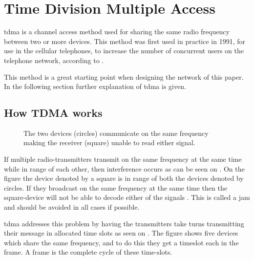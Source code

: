 \chapter{Time Division Multiple Access}\label{TDMA}

\gls{tdma} is a channel access method used for sharing the same radio frequency between two or more devices.
This method was first used in practice in 1991, for use in the cellular telephones, to increase the number of concurrent users on the telephone network, according to \citet{networkencyclopedia2013time}.

This method is a great starting point when designing the network of this paper.
In the following section further explanation of \gls{tdma} is given.

\section{How TDMA works}

\begin{SCfigure}
    \vspace{-10pt}
    \centering
    \footnotesize
    \resizebox{0.5\linewidth}{!}{%
}
    \caption{The two devices (circles) communicate on the same frequency making the receiver (square) unable to read either signal.}
    \label{fig:rangediagram}
    \vspace{-10pt}    
\end{SCfigure}

If multiple radio-transmitters transmit on the same frequency at the same time while in range of each other, then interference occurs as can be seen on . 
On the figure the device denoted by a square is in range of both the devices denoted by circles. 
If they broadcast on the same frequency at the same time then the square-device will not be able to decode either of the signals \cite{networkencyclopedia2013time, networkencyclopedia2013advanced}.
This is called a jam and should be avoided in all cases if possible.

\gls{tdma} addresses this problem by having the transmitters take turns transmitting their message in allocated time slots as seen on .
The figure shows five devices which share the same frequency, and to do this they get a timeslot each in the frame.
A frame is the complete cycle of these time-slots.



